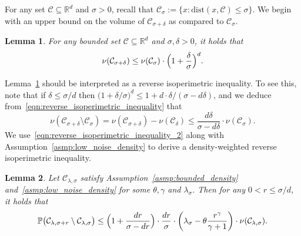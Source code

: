 \documentclass{article}
\newcommand{\Reals}{\mathbb{R}}
\newcommand{\1}{\mathbf{1}}
\newcommand{\Rd}{\Reals^d}
\newcommand{\mc}[1]{\mathcal{#1}}
\newcommand{\Pbb}{\mathbb{P}}
\newtheorem{lemma}{Lemma}[section]
\theoremstyle{definition}
\theoremstyle{remark}
\begin{document}
For any set $\mc{C} \subseteq \Rd$ and $\sigma > 0$, recall that $\mc{C}_{\sigma} := \{x: \mathrm{dist}(x,\mc{C}) \leq \sigma\}$. We begin with an upper bound on the volume of $\mc{C}_{\sigma + \delta}$ as compared to $\mc{C}_{\sigma}$. 
\begin{lemma}
	\label{lem:reverse_isoperimetric_inequality}
	For any bounded set $\mc{C} \subseteq \Rd$ and  $\sigma, \delta > 0$, it holds that
	\begin{equation}
	\label{eqn:reverse_isoperimetric_inequality}
	\nu(\mc{C}_{\sigma + \delta}) \leq \nu(\mc{C}_{\sigma}) \cdot \Bigl(1 + \frac{\delta}{\sigma}\Bigr)^d.
	\end{equation}
\end{lemma}
Lemma~\ref{lem:reverse_isoperimetric_inequality} should be interpreted as a reverse isoperimetric inequality. To see this, note that if $\delta \leq \sigma/d$ then $\bigl(1 + \delta/\sigma\bigr)^d \leq 1 + d \cdot \delta/(\sigma - d\delta)$, and we deduce from~\eqref{eqn:reverse_isoperimetric_inequality} that
\begin{equation}
\label{eqn:reverse_isoperimetric_inequality_2}
\nu(\mc{C}_{\sigma + \delta} \setminus \mc{C}_{\sigma}) = \nu(\mc{C}_{\sigma + \delta}) - \nu(\mc{C}_{\delta}) \leq \frac{d\delta}{\sigma - d\delta} \cdot \nu(\mc{C}_{\sigma}).
\end{equation}
We use~\eqref{eqn:reverse_isoperimetric_inequality_2} along with Assumption~\ref{asmp:low_noise_density} to derive a density-weighted reverse isoperimetric inequality. 
\begin{lemma}
	\label{lem:reverse_isoperimetric_inequality_density_weighted}
	Let $\mc{C}_{\lambda,\sigma}$ satisfy Assumption~\ref{asmp:bounded_density} and~\ref{asmp:low_noise_density} for some $\theta, \gamma$ and $\lambda_{\sigma}$. Then for any $0 < r \leq \sigma/d$, it holds that
	\begin{equation}
	\label{eqn:reverse_isoperimetric_inequality_density_weighted}
	\Pbb\bigl(\mc{C}_{\lambda,\sigma + r} \setminus \mc{C}_{\lambda,\sigma}\bigr) \leq \Bigl(1 + \frac{dr}{\sigma - dr}\Bigr) \cdot \frac{dr}{\sigma} \cdot \left(\lambda_{\sigma} - \theta\frac{r^{\gamma}}{\gamma + 1}\right) \cdot \nu(\mc{C}_{\lambda,\sigma}).
	\end{equation}
\end{lemma}
\end{document}
